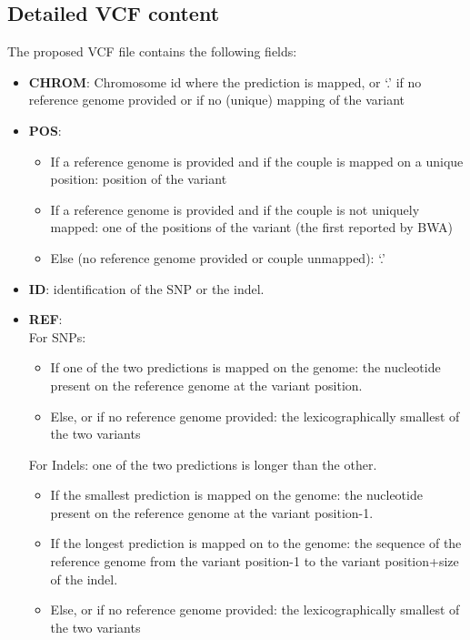 \documentclass{bmcart}
\newcommand{\discopp}{{\it DiscoSnp++}\xspace}
\begin{document}
\subsection{Detailed VCF content}
The proposed VCF file contains the following fields:
\begin{itemize}
	\item \textbf{CHROM}: Chromosome id where the prediction is mapped, or `.' if no reference genome provided or if no (unique) mapping of the variant
	\item \textbf{POS}: 
	\begin{itemize}
		\item If a reference genome is provided and if the couple is mapped on a unique position: position of the variant
		\item If a reference genome is provided and if the couple is not uniquely mapped: one of the positions of the variant (the first reported by BWA)
		\item Else (no reference genome provided or couple unmapped): `.'
	\end{itemize}
	\item \textbf{ID}: identification of the SNP or the indel. 
	\item \textbf{REF}: \\
	For SNPs:
	\begin{itemize}
		\item If one of the two predictions is mapped on the genome: the nucleotide present on the reference genome at the variant position.
		\item Else, or if no reference genome provided: the lexicographically smallest of the two variants
	\end{itemize}
	For Indels: one of the two predictions is longer than the other.%
	\begin{itemize}
		\item If the smallest prediction is mapped on the genome: the nucleotide present on the reference genome at the variant position-1.
		\item If the longest prediction is mapped on to the genome: the sequence of the reference genome from the variant position-1 to the variant position+size of the indel.
		\item Else, or if no reference genome provided: the lexicographically smallest of the two variants

\end{itemize}
\end{itemize}
\end{document}
